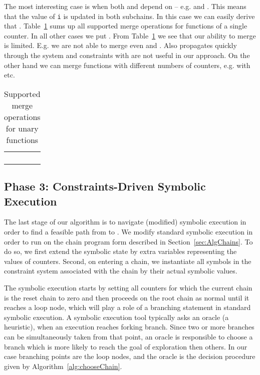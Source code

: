 \documentclass{llncs}
\begin{document}
The most interesting case is when both  and 
depend on  -- e.g.   and . This means that
the value of \texttt{i} is updated in both subchains. In this case we can easily
derive that . Table~\ref{tab:merging} sums up all supported merge operations
for functions of a single counter. In all other cases we put
.  
From Table~\ref{tab:merging} we see that our ability to merge is
limited. E.g. we are not able to merge even  and . Also  propagates quickly
through the system and constraints with  are not useful in our
approach.
On the other hand we can merge functions with
different numbers of counters, e.g.   with
 etc.

\begin{table}[!htbp]
  \centering
  \begin{tabular}{|c|c|c|}
    \hline
     &  &  \\
    \hline
     &  &  \\
     &  & \\
     &  & 
      \\
     &  & 
     \\
    \hline 
  \end{tabular}
\medskip

  \caption{Supported merge operations for unary functions}
  \label{tab:merging}
\vspace{-1.2cm}
\end{table}

\subsection{Phase 3: Constraints-Driven Symbolic Execution}
\label{sec:AlgSolving}

The last stage of our algorithm is to navigate (modified) symbolic execution
in order to find a feasible path from  to . We
modify standard symbolic execution in order to run on the chain program form
described in Section~\ref{sec:AlgChains}. To do so, we first extend the
symbolic state by extra variables representing the values of
counters. Second, on entering a chain, we instantiate all symbols  in the
constraint system associated with the chain by their
actual symbolic values.

The symbolic execution starts by setting all counters for which the current
chain is the reset chain to zero and then proceeds on the root chain as
normal until it reaches a loop node, which will play a role of a branching
statement in standard symbolic execution.  A symbolic execution tool
typically asks an oracle (a heuristic), when an execution reaches forking
branch. Since two or more branches can be simultaneously taken from that
point, an oracle is responsible to choose a branch which is more likely to
reach the goal of exploration then others. In our case branching points are
the loop nodes, and the oracle is the decision
procedure given by Algorithm~\ref{alg:chooseChain}.
\end{document}
